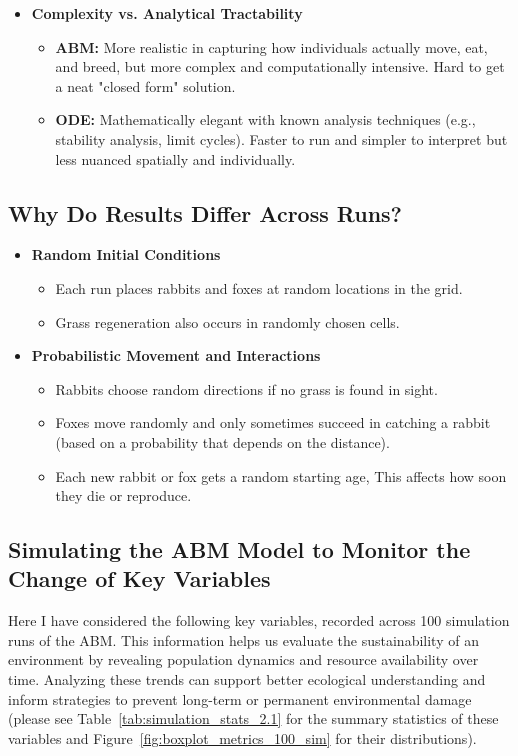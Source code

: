 \begin{itemize}
    \item \textbf{Complexity vs. Analytical Tractability}
    \begin{itemize}
        \item \textbf{ABM:} More realistic in capturing how individuals actually move, eat, and breed, but more complex and computationally intensive. Hard to get a neat "closed form" solution.
        \item \textbf{ODE:} Mathematically elegant with known analysis techniques (e.g., stability analysis, limit cycles). Faster to run and simpler to interpret but less nuanced spatially and individually.
    \end{itemize}
\end{itemize}

\subsection[short]{Why Do Results Differ Across Runs?}

\begin{itemize}
    \item \textbf{Random Initial Conditions}
    \begin{itemize}
        \item Each run places rabbits and foxes at random locations in the grid.
        \item Grass regeneration also occurs in randomly chosen cells.
    \end{itemize}

    \item \textbf{Probabilistic Movement and Interactions}
    \begin{itemize}
        \item Rabbits choose random directions if no grass is found in sight.
        \item Foxes move randomly and only sometimes succeed in catching a rabbit (based on a probability that depends on the distance).
        \item Each new rabbit or fox gets a random starting age, This affects how soon they die or reproduce.
    \end{itemize}

\end{itemize}

\subsection[short]{Simulating the ABM Model to Monitor the Change of Key Variables}
Here I have considered the following key variables, recorded across 100 simulation runs of the ABM. This information helps us evaluate the sustainability of an environment by revealing population dynamics and resource availability over time. Analyzing these trends can support better ecological understanding and inform strategies to prevent long-term or permanent environmental damage (please see Table~\ref{tab:simulation_stats_2.1} for the summary statistics of these variables and Figure~\ref{fig:boxplot_metrics_100_sim} for their distributions).

